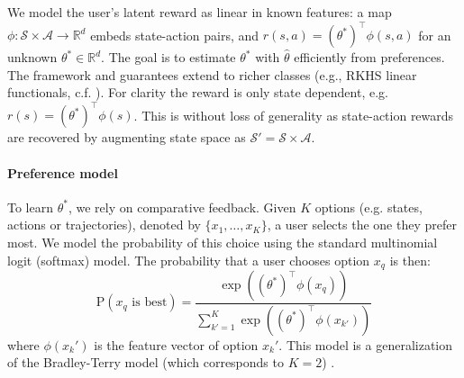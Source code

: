 \documentclass{article}
\newcommand{\mS}{\mathcal{S}}
\newcommand{\mA}{\mathcal{A}}
\begin{document}
We model the user's latent reward as linear in known features: a map $\phi: \mS\!\times\!\mA \to \mathbb{R}^d$ embeds state-action pairs, and $r(s,a) = (\theta^*)^\top \phi(s,a)$ for an unknown $\theta^* \in \mathbb{R}^d$. The goal is to estimate $\theta^*$ with $\hat{\theta}$ efficiently from preferences. The framework and guarantees extend to richer classes (e.g., RKHS linear functionals, c.f. \cite{pmlr-v206-mutny23a}). For clarity the reward is only state dependent, e.g. $r(s)=(\theta^*)^\top\phi(s)$. This is without loss of generality as state-action rewards are recovered by augmenting state space as $\mS' = \mS \times \mA$.
\vspace{-0.2cm} \paragraph{Preference model}To learn $\theta^*$, we rely on comparative feedback. Given $K$ options (e.g. states, actions or trajectories), denoted by $\{x_1, \dots, x_K\}$, a user selects the one they prefer most. We model the probability of this choice using the standard multinomial logit (softmax) model. The probability that a user chooses option $x_q$ is then:
\begin{equation} \label{eq:softmax_general}
\text{P}(x_q \text{ is best}) = \frac{\exp((\theta^*)^\top \phi(x_q))}{\sum_{k'=1}^K \exp((\theta^*)^\top \phi(x_{k'}))}
\end{equation}
where $\phi(x_k')$ is the feature vector of option $x_k'$. This model is a generalization of the Bradley-Terry model (which corresponds to $K=2$) \citep{19ff28b9-64f9-3656-ba40-08326a05748e}.
\end{document}
